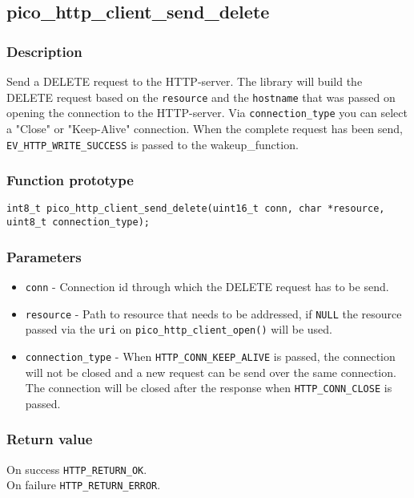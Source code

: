 
\subsection{pico\_http\_client\_send\_delete}

\subsubsection*{Description}
Send a DELETE request to the HTTP-server. The library will build the DELETE request based on the \texttt{resource} and the \texttt{hostname} that was passed on opening the connection to the HTTP-server. Via \texttt{connection\_type} you can select a "Close" or "Keep-Alive" connection. When the complete request has been send, \texttt{EV\_HTTP\_WRITE\_SUCCESS} is passed to the wakeup\_function.

\subsubsection*{Function prototype}
\texttt{int8\_t pico\_http\_client\_send\_delete(uint16\_t conn, char *resource, uint8\_t connection\_type);}

\subsubsection*{Parameters}
\begin{itemize}[noitemsep]
\item \texttt{conn} - Connection id through which the DELETE request has to be send.
\item \texttt{resource} - Path to resource that needs to be addressed, if \texttt{NULL} the resource passed via the \texttt{uri} on \texttt{pico\_http\_client\_open()} will be used.
\item \texttt{connection\_type} - When \texttt{HTTP\_CONN\_KEEP\_ALIVE} is passed, the connection will not be closed and a new request can be send over the same connection. The connection will be closed after the response when \texttt{HTTP\_CONN\_CLOSE} is passed.
\end{itemize}
\subsubsection*{Return value}
On success \texttt{HTTP\_RETURN\_OK}.
\\On failure \texttt{HTTP\_RETURN\_ERROR}.
